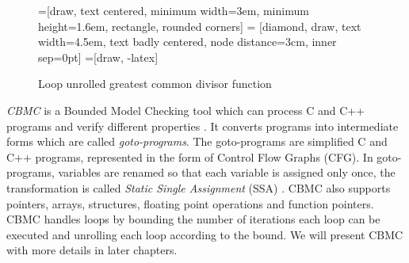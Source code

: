 \begin{figure}[h]
    \centering
    =[draw, text centered, minimum width=3em, minimum height=1.6em, rectangle, rounded corners]
     = [diamond, draw, text width=4.5em, text badly centered, node distance=3cm, inner sep=0pt]
    =[draw, -latex]
   \caption{Loop unrolled greatest common divisor function}
   \label{fig:example:test:coverage:code:loopunrolled}
\end{figure}



\emph{CBMC} is a Bounded Model Checking tool which can process C and C++ programs and verify different properties \cite{website:cprover:cbmc, clarke2006ansi, Clarke04atool}. It converts programs into intermediate forms which are called \emph{goto-programs}. The goto-programs are simplified C and C++ programs, represented in the form of Control Flow Graphs (CFG). In goto-programs, variables are renamed so that each variable is assigned only once, the transformation is called \emph{Static Single Assignment} (SSA) \cite{Clarke04atool}. CBMC also supports pointers, arrays, structures, floating point operations and function pointers. CBMC handles loops by bounding the number of iterations each loop can be executed and unrolling each loop according to the bound. We will present CBMC with more details in later chapters.


